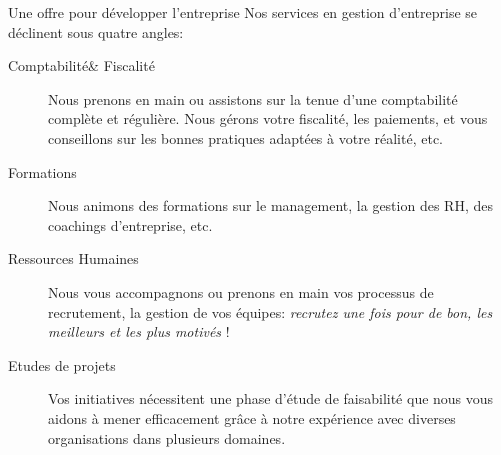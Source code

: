 \documentclass[10pt,french]{beamer}
\begin{document}
\begin{frame}[fragile]{Une offre pour développer l'entreprise}
 Nos services en gestion d'entreprise se déclinent sous quatre angles:
 \begin{description}
  \item[Comptabilité\& Fiscalité]{Nous prenons en main ou assistons sur la tenue d'une comptabilité complète et régulière. Nous gérons votre fiscalité, les paiements, et vous conseillons sur les bonnes pratiques adaptées à votre réalité, etc.}
  
  \item[Formations]{Nous animons des formations sur le management, la gestion des RH, des coachings d'entreprise, etc.}
  
  \item[Ressources Humaines]{Nous vous accompagnons ou prenons en main vos processus de recrutement, la gestion de vos équipes:      \textsl{recrutez une fois pour de bon, les meilleurs et les plus motivés} !}
  
  \item[Etudes de projets]{Vos initiatives nécessitent une phase d'étude de faisabilité que nous vous aidons à mener efficacement grâce à notre expérience avec diverses organisations dans plusieurs domaines}.
 \end{description}
\end{frame}
\end{document}
